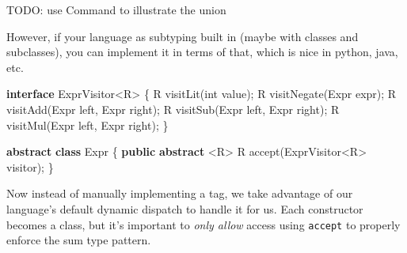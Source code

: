 \documentclass[]{article}
\newenvironment{Shaded}{}{}
\newcommand{\DataTypeTok}[1]{\textcolor[rgb]{0.56,0.13,0.00}{#1}}
\newcommand{\FunctionTok}[1]{\textcolor[rgb]{0.02,0.16,0.49}{#1}}
\newcommand{\KeywordTok}[1]{\textcolor[rgb]{0.00,0.44,0.13}{\textbf{#1}}}
\newcommand{\NormalTok}[1]{#1}
\newcommand{\OperatorTok}[1]{\textcolor[rgb]{0.40,0.40,0.40}{#1}}
\begin{document}
TODO: use Command to illustrate the union

However, if your language as subtyping built in (maybe with classes and
subclasses), you can implement it in terms of that, which is nice in python,
java, etc.

\begin{Shaded}
\begin{Highlighting}[]
\KeywordTok{interface}\NormalTok{ ExprVisitor}\OperatorTok{\textless{}}\NormalTok{R}\OperatorTok{\textgreater{}} \OperatorTok{\{}
\NormalTok{    R }\FunctionTok{visitLit}\OperatorTok{(}\DataTypeTok{int}\NormalTok{ value}\OperatorTok{);}
\NormalTok{    R }\FunctionTok{visitNegate}\OperatorTok{(}\NormalTok{Expr expr}\OperatorTok{);}
\NormalTok{    R }\FunctionTok{visitAdd}\OperatorTok{(}\NormalTok{Expr left}\OperatorTok{,}\NormalTok{ Expr right}\OperatorTok{);}
\NormalTok{    R }\FunctionTok{visitSub}\OperatorTok{(}\NormalTok{Expr left}\OperatorTok{,}\NormalTok{ Expr right}\OperatorTok{);}
\NormalTok{    R }\FunctionTok{visitMul}\OperatorTok{(}\NormalTok{Expr left}\OperatorTok{,}\NormalTok{ Expr right}\OperatorTok{);}
\OperatorTok{\}}

\KeywordTok{abstract} \KeywordTok{class}\NormalTok{ Expr }\OperatorTok{\{}
    \KeywordTok{public} \KeywordTok{abstract} \OperatorTok{\textless{}}\NormalTok{R}\OperatorTok{\textgreater{}}\NormalTok{ R }\FunctionTok{accept}\OperatorTok{(}\NormalTok{ExprVisitor}\OperatorTok{\textless{}}\NormalTok{R}\OperatorTok{\textgreater{}}\NormalTok{ visitor}\OperatorTok{);}
\OperatorTok{\}}
\end{Highlighting}
\end{Shaded}

Now instead of manually implementing a tag, we take advantage of our language's
default dynamic dispatch to handle it for us. Each constructor becomes a class,
but it's important to \emph{only allow} access using \texttt{accept} to properly
enforce the sum type pattern.
\end{document}

